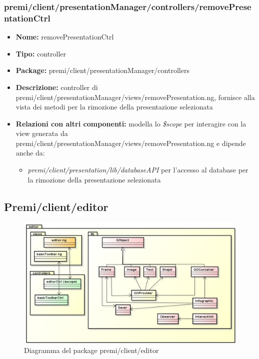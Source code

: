\subsubsection{premi/client/presentationManager/controllers/removePresentationCtrl}
\begin{itemize}
  \item[] \textbf{Nome:} removePresentationCtrl
  \item[] \textbf{Tipo:} controller
  \item[] \textbf{Package:} premi/client/presentationManager/controllers
  \item[] \textbf{Descrizione:} controller di premi/client/presentationManager/views/removePresentation.ng, fornisce alla vista dei metodi per la rimozione della presentazione selezionata
  \item[] \textbf{Relazioni con altri componenti:} modella lo \textit{\$scope} per interagire con la view generata da premi/client/presentationManager/views/removePresentation.ng e dipende anche da:
 \begin{itemize}
 \item \textit{premi/client/presentation/lib/databaseAPI} per l'accesso al database per la rimozione della presentazione selezionata
\end{itemize}
\end{itemize}



\clearpage
\subsection{Premi/client/editor}
\begin{figure}[!h]
\begin{center}
\includegraphics[scale=0.45]{img/diapkg/editor.png}
\caption{Diagramma del package premi/client/editor}
\end{center}
\end{figure}
